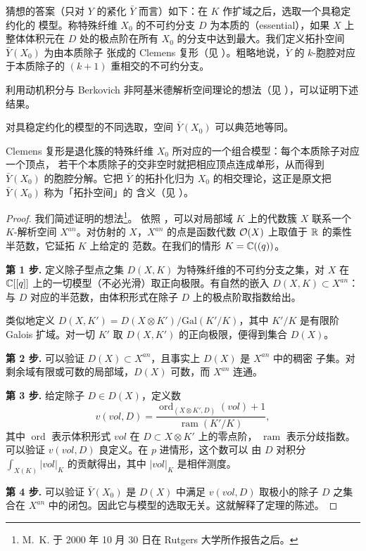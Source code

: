 猜想的答案（只对 $Y$ 的紧化 $\bar Y$ 而言）如下：在 $K$ 作扩域之后，选取一个具稳定约化的
模型。称特殊纤维 $X_0$ 的不可约分支 $D$ 为本质的（essential），如果 $X$ 上整体体积元在
$D$ 处的极点阶在所有 $X_0$ 的分支中达到最大。我们定义拓扑空间 $\bar Y(X_0)$ 为由本质除子
张成的 Clemens 复形（见 \cite{LTY}）。粗略地说，$\bar Y$ 的 $k$-胞腔对应于本质除子的
$(k+1)$ 重相交的不可约分支。

利用动机积分与 Berkovich 非阿基米德解析空间理论的想法（见 \cite{Be}），可以证明下述结果。

\begin{prp}
对具稳定约化的模型的不同选取，空间 $\bar Y(X_0)$ 可以典范地等同。
\end{prp}

\begin{yizhu}[Clemens 复形]
Clemens 复形是退化簇的特殊纤维 $X_0$ 所对应的一个组合模型：每个本质除子对应一个顶点，
若干个本质除子的交非空时就把相应顶点连成单形，从而得到 $\bar Y(X_0)$ 的胞腔分解。它把
$\bar Y$ 的拓扑化归为 $X_0$ 的相交理论，这正是原文把 $\bar Y(X_0)$ 称为「拓扑空间」的
含义（见 \cite{LTY}）。
\end{yizhu}

\begin{proof}
我们简述证明的想法\footnote{M.~K. 于 2000 年 10 月 30 日在 Rutgers 大学所作报告之后。}。
依照 \cite{Be}，可以对局部域 $K$ 上的代数簇 $X$ 联系一个 $K$-解析空间 $X^{an}$。对仿射的
$X$，$X^{an}$ 的点是函数代数 $\mathcal{O}(X)$ 上取值于 $\mathbb{R}$ 的乘性半范数，它延拓 $K$ 上给定的
范数。在我们的情形 $K=\mathbb{C}((q))$。

\textbf{第 1 步.} 定义除子型点之集 $D(X,K)$ 为特殊纤维的不可约分支之集，对 $X$ 在
$\mathbb{C}[[q]]$ 上的一切模型（不必光滑）取正向极限。有自然的嵌入 $D(X,K)\subset X^{an}$：
与 $D$ 对应的半范数，由体积形式在除子 $D$ 上的极点阶取指数给出。

类似地定义 $D(X,K')=D(X\otimes K')/\mathrm{Gal}(K'/K)$，其中 $K'/K$ 是有限阶 Galois
扩域。对一切 $K'$ 取 $D(X,K')$ 的正向极限，便得到集合 $D(X)$。

\textbf{第 2 步.} 可以验证 $D(X)\subset X^{an}$，且事实上 $D(X)$ 是 $X^{an}$ 中的稠密
子集。对剩余域有限或可数的局部域，$D(X)$ 可数，而 $X^{an}$ 连通。

\textbf{第 3 步.} 给定除子 $D\in D(X)$，定义数
\[
  v(vol,D)=\frac{\operatorname{ord}_{(X\otimes K',D)}(vol)+1}
                  {\operatorname{ram}(K'/K)},
\]
其中 $\operatorname{ord}$ 表示体积形式 $vol$ 在 $D\subset X\otimes K'$ 上的零点阶，
$\operatorname{ram}$ 表示分歧指数。可以验证 $v(vol,D)$ 良定义。在 $p$ 进情形，这个数可以
由 $D$ 对积分 $\int_{X(K)}|vol|_K$ 的贡献得出，其中 $|vol|_K$ 是相伴测度。

\textbf{第 4 步.} 可以验证 $\bar Y(X_0)$ 是 $D(X)$ 中满足 $v(vol,D)$ 取极小的除子 $D$
之集合在 $X^{an}$ 中的闭包。因此它与模型的选取无关。这就解释了定理的陈述。
\end{proof}


